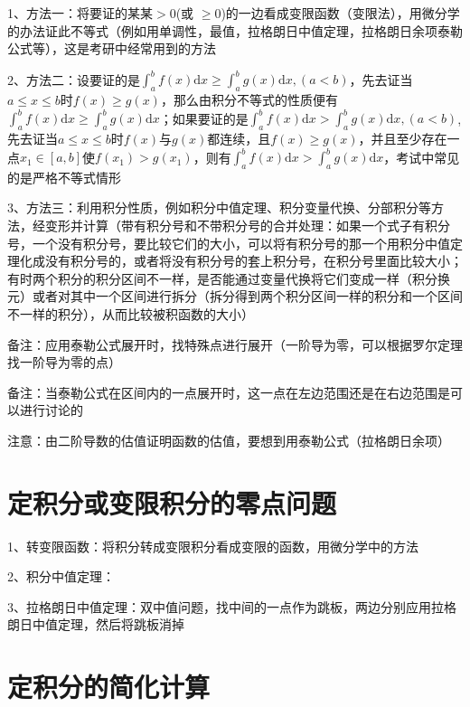 1、方法一：将要证的某某$\gt 0$(或 $\ge 0$)的一边看成变限函数（变限法），用微分学的办法证此不等式（例如用单调性，最值，拉格朗日中值定理，拉格朗日余项泰勒公式等），这是考研中经常用到的方法

2、方法二：设要证的是$\int_{a}^{b} f(x) \mathrm{d} x \geqslant \int_{a}^{b} g(x) \mathrm{d} x,(a<b)$，先去证当$a \leqslant x \leqslant b$时$f(x) \geqslant g(x)$，那么由积分不等式的性质便有 $\int_{a}^{b} f(x) \mathrm{d} x \geqslant \int_{a}^{b} g(x) \mathrm{d} x$；如果要证的是$\int_{a}^{b} f(x) \mathrm{d} x>\int_{a}^{b} g(x) \mathrm{d} x,(a<b)$, 先去证当$a \leqslant x \leqslant b$时$f(x)$与$g(x)$都连续，且$f(x) \geqslant g(x)$，并且至少存在一点$x_{1} \in[a, b]$使$f\left(x_{1}\right)>g\left(x_{1}\right)$，则有$\int_{a}^{b} f(x) \mathrm{d} x>\int_{a}^{b} g(x) \mathrm{d} x$，考试中常见的是严格不等式情形

3、方法三：利用积分性质，例如积分中值定理、积分变量代换、分部积分等方法，经变形并计算（带有积分号和不带积分号的合并处理：如果一个式子有积分号，一个没有积分号，要比较它们的大小，可以将有积分号的那一个用积分中值定理化成没有积分号的，或者将没有积分号的套上积分号，在积分号里面比较大小；有时两个积分的积分区间不一样，是否能通过变量代换将它们变成一样（积分换元）或者对其中一个区间进行拆分（拆分得到两个积分区间一样的积分和一个区间不一样的积分），从而比较被积函数的大小）

备注：应用泰勒公式展开时，找特殊点进行展开（一阶导为零，可以根据罗尔定理找一阶导为零的点）

备注：当泰勒公式在区间内的一点展开时，这一点在左边范围还是在右边范围是可以进行讨论的

注意：由二阶导数的估值证明函数的估值，要想到用泰勒公式（拉格朗日余项）

\section{定积分或变限积分的零点问题}

1、转变限函数：将积分转成变限积分看成变限的函数，用微分学中的方法

2、积分中值定理：

3、拉格朗日中值定理：双中值问题，找中间的一点作为跳板，两边分别应用拉格朗日中值定理，然后将跳板消掉

\section{定积分的简化计算}



